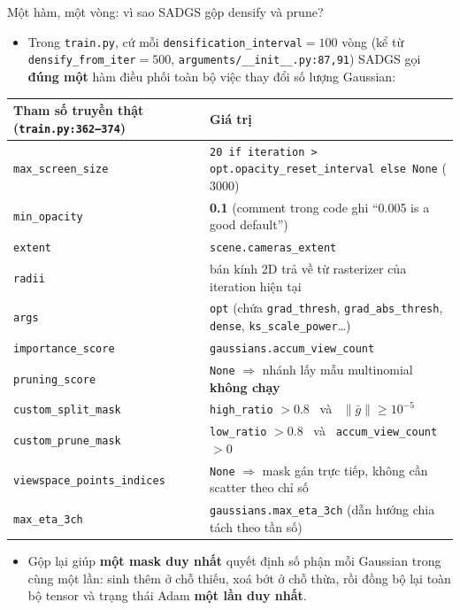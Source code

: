
\begin{frame}{Một hàm, một vòng: vì sao SADGS gộp densify và prune?}
\footnotesize
\begin{itemize}
    \item Trong \texttt{train.py}, cứ mỗi \texttt{densification\_interval}$=100$ vòng (kể từ \texttt{densify\_from\_iter}$=500$, \texttt{arguments/\_\_init\_\_.py:87,91}) SADGS gọi \textbf{đúng một} hàm điều phối toàn bộ việc thay đổi số lượng Gaussian:
\end{itemize}
\begin{center}\scriptsize
\begin{tabular}{ll}
\hline
\textbf{Tham số truyền thật} (\texttt{train.py:362--374}) & \textbf{Giá trị} \\
\hline
\texttt{max\_screen\_size} & \texttt{20 if iteration > opt.opacity\_reset\_interval else None} ($3000$) \\
\texttt{min\_opacity} & \textbf{0.1} \quad (comment trong code ghi ``0.005 is a good default'') \\
\texttt{extent} & \texttt{scene.cameras\_extent} \\
\texttt{radii} & bán kính 2D trả về từ rasterizer của iteration hiện tại \\
\texttt{args} & \texttt{opt} (chứa \texttt{grad\_thresh}, \texttt{grad\_abs\_thresh}, \texttt{dense}, \texttt{ks\_scale\_power}\dots) \\
\texttt{importance\_score} & \texttt{gaussians.accum\_view\_count} \\
\texttt{pruning\_score} & \texttt{None} $\Rightarrow$ nhánh lấy mẫu multinomial \textbf{không chạy} \\
\texttt{custom\_split\_mask} & \texttt{high\_ratio} $>0.8$ \ và \ $\|\bar g\| \ge 10^{-5}$ \\
\texttt{custom\_prune\_mask} & \texttt{low\_ratio} $>0.8$ \ và \ \texttt{accum\_view\_count} $>0$ \\
\texttt{viewspace\_points\_indices} & \texttt{None} $\Rightarrow$ mask gán trực tiếp, không cần scatter theo chỉ số \\
\texttt{max\_eta\_3ch} & \texttt{gaussians.max\_eta\_3ch} (dẫn hướng chia tách theo tần số) \\
\hline
\end{tabular}
\end{center}
\begin{itemize}
    \item Gộp lại giúp \textbf{một mask duy nhất} quyết định số phận mỗi Gaussian trong cùng một lần: sinh thêm ở chỗ thiếu, xoá bớt ở chỗ thừa, rồi đồng bộ lại toàn bộ tensor và trạng thái Adam \textbf{một lần duy nhất}.
\end{itemize}
\end{frame}

